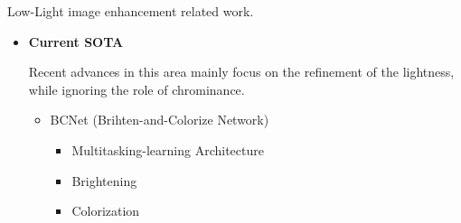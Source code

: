 \documentclass[CJK,aspectratio=169]{beamer}  %
\begin{document}
	\begin{frame}
		
		Low-Light image enhancement related work.
		
		\begin{itemize} 
			\item \textbf{Current SOTA}\textcolor{blue}{\citep{wang2023brighten}}
			
			Recent advances in this area mainly focus on the refinement of the lightness, while ignoring the role of chrominance.
			
			
			
			\begin{itemize}
			
			\item BCNet (Brihten-and-Colorize Network)	
				
			
			
			
				\begin{itemize}
					
					\item Multitasking-learning Architecture 
					
					
					
					\item Brightening
					
					\item Colorization
					
				\end{itemize}
			

\end{itemize}
\end{itemize}
\end{frame}
\end{document}
